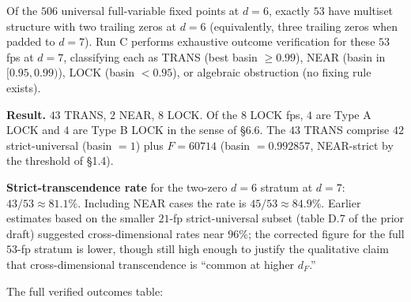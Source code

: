 \documentclass[11pt,letterpaper]{article}
\theoremstyle{paperstyle}
\theoremstyle{paperstyledef}
\theoremstyle{paperstylerem}
\begin{document}
Of the \(506\) universal full-variable fixed points at \(d = 6\),
exactly \(53\) have multiset structure with two trailing zeros at
\(d = 6\) (equivalently, three trailing zeros when padded to \(d = 7\)).
Run C performs exhaustive outcome verification for these \(53\) fps at
\(d = 7\), classifying each as TRANS (best basin \(\geq 0.99\)), NEAR
(basin in \([0.95, 0.99)\)), LOCK (basin \(< 0.95\)), or algebraic
obstruction (no fixing rule exists).

\textbf{Result.} \(43\) TRANS, \(2\) NEAR, \(8\) LOCK. Of the \(8\) LOCK
fps, \(4\) are Type A LOCK and \(4\) are Type B LOCK in the sense of
§6.6. The \(43\) TRANS comprise \(42\) strict-universal (basin \(= 1\))
plus \(F = 60714\) (basin \(= 0.992857\), NEAR-strict by the threshold
of §1.4).

\textbf{Strict-transcendence rate} for the two-zero \(d = 6\) stratum at
\(d = 7\): \(43/53 \approx 81.1\%\). Including NEAR cases the rate is
\(45/53 \approx 84.9\%\). Earlier estimates based on the smaller
\(21\)-fp strict-universal subset (table D.7 of the prior draft)
suggested cross-dimensional rates near \(96\%\); the corrected figure
for the full \(53\)-fp stratum is lower, though still high enough to
justify the qualitative claim that cross-dimensional transcendence is
``common at higher \(d_F\).''

The full verified outcomes table:
\end{document}
